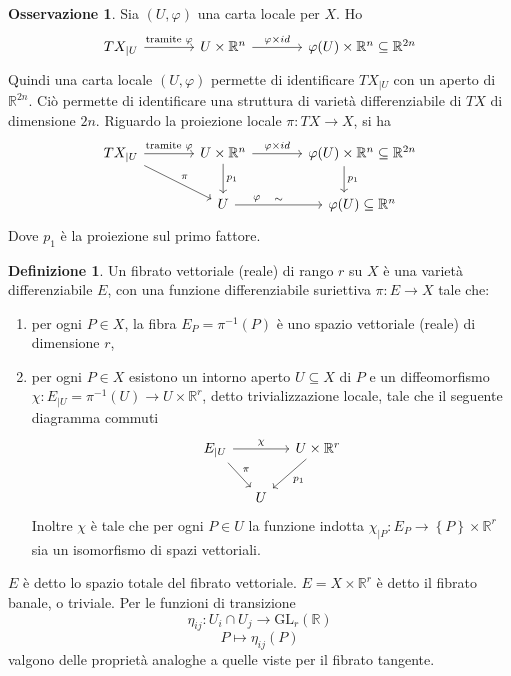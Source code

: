 \documentclass[a4paper,11pt]{article}
\theoremstyle{definition}
\newtheorem{osservazione}{Osservazione}[section]
\newtheorem{definizione}{Definizione}[section]
\theoremstyle{theorem}
\begin{document}
\begin{osservazione}
	Sia $(U,\varphi)$ una carta locale per $X$. Ho
	\[\begin{tikzcd}[column sep=large]
	TX_{|U}\arrow[r, "\textrm{tramite }\varphi"]&U\times\mathbb{R}^n\arrow[r, "\varphi\times id"]&\varphi(U)\times\mathbb{R}^n\subseteq\mathbb{R}^{2n}
	\end{tikzcd}\]
	Quindi una carta locale $(U,\varphi)$ permette di identificare $TX_{|U}$ con un aperto di $\mathbb{R}^{2n}$. Ciò permette di identificare una struttura di varietà differenziabile di $TX$ di dimensione $2n$.
	Riguardo la proiezione locale $\pi\colon TX\to X$, si ha
	\[\begin{tikzcd}[column sep=large]
	TX_{|U}\arrow[r, "\textrm{tramite }\varphi"]\arrow[dr, "\pi"]&U\times\mathbb{R}^n\arrow[r, "\varphi\times id"]\arrow[d, "p_1"]&\varphi(U)\times\mathbb{R}^n\subseteq\mathbb{R}^{2n}\arrow[d, "p_1", shift right=3ex]\\
& U\arrow[r, "\varphi" near start, "\sim"]&\varphi(U)\subseteq\mathbb{R}^n
	\end{tikzcd}\]
	Dove $p_1$ è la proiezione sul primo fattore.
\end{osservazione}
\begin{definizione}
	Un fibrato vettoriale (reale) di rango $r$ su $X$ è una varietà differenziabile $E$, con una funzione differenziabile suriettiva $\pi\colon E\to X$ tale che:
	\begin{enumerate}
		\item per ogni $P\in X$, la fibra $E_P=\pi^{-1}(P)$ è uno spazio vettoriale (reale) di dimensione $r$,
		\item per ogni $P\in X$ esistono un intorno aperto $U\subseteq X$ di $P$ e un diffeomorfismo $\chi\colon E_{|U}=\pi^{-1}(U)\to U\times\mathbb{R}^r$, detto trivializzazione locale, tale che il seguente diagramma commuti
		\[\begin{tikzcd}[column sep=small]
		E_{|U}\arrow[rr, "\chi"]\arrow[dr, "\pi"] && U\times\mathbb{R}^r\arrow[dl, "p_1"]\\
		& U&
		\end{tikzcd}\]
		Inoltre $\chi$ è tale che per ogni $P\in U$ la funzione indotta $\chi_{|P}\colon E_P\to\left\{P\right\}\times\mathbb{R}^r$ sia un isomorfismo di spazi vettoriali.
	\end{enumerate}
	$E$ è detto lo spazio totale del fibrato vettoriale.
	$E=X\times\mathbb{R}^r$ è detto il fibrato banale, o triviale.
	Per le funzioni di transizione
	\[\eta_{ij}\colon U_i\cap U_j\to\mathrm{GL}_r(\mathbb{R})\]
	\[P\mapsto \eta_{ij}(P)\]
	valgono delle proprietà analoghe a quelle viste per il fibrato tangente.
\end{definizione}
\end{document}
